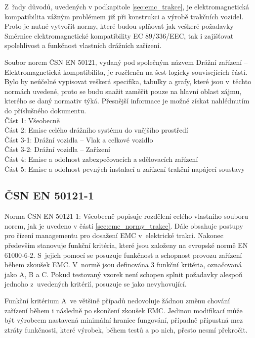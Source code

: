  Z~řady důvodů, uvedených v podkapitole \ref{sec:emc_trakce},  je elektromagnetická kompatibilita vážným problémem již při konstrukci a výrobě trakčních vozidel. Proto je nutné vytvořit normy, které budou splňovat jak veškeré požadavky Směrnice elektromagnetické kompatibility EC 89/336/EEC, tak i zajišťovat spolehlivost a funkčnost vlastních drážních zařízení.

Soubor norem ČSN EN 50121, vydaný pod společným názvem Drážní zařízení – Elektromagnetická kompatibilita, je rozčleněn na šest logicky souvisejících částí. Bylo by neúčelné vypisovat veškerá specifika, tabulky a grafy, které jsou v~těchto normách uvedené, proto se budu snažit zaměřit pouze na hlavní oblast zájmu, kterého se daný normativ týká. Přesnější informace je možné získat nahlédnutím do příslušného dokumentu. \bigskip \\
Část 1: Všeobecně\\
Část 2: Emise celého drážního  systému do vnějšího prostředí\\
Část 3-1: Drážní vozidla – Vlak a celkové vozidlo\\
Část 3-2: Drážní vozidla – Zařízení\\
Část 4: Emise a odolnost zabezpečovacích a sdělovacích zařízení\\
Část 5: Emise a odolnost pevných instalací a zařízení trakční napájecí soustavy\\

\subsection{ČSN EN 50121-1}
Norma ČSN EN 50121-1: Všeobecně popisuje rozdělení celého vlastního souboru norem, jak je uvedeno v části \ref{sec:emc_normy_trakce}. Dále obsahuje postupy pro řízení managementu pro dosažení EMC v~elektrické trakci. Nakonec především stanovuje funkční kritéria, které jsou založeny na evropské normě EN 61000-6-2. S~jejich pomocí se posuzuje funkčnost a schopnost provozu zařízení během zkoušek EMC. V~normě jsou definována 3 funkční kritéria, označovaná jako A, B a C. Pokud testovaný vzorek není schopen splnit požadavky alespoň jednoho z~uvedených kritérií, posuzuje se jako nevyhovující.

Funkční kritérium A~ve většině případů nedovoluje žádnou změnu chování zařízení během i následně po skončení zkoušek EMC. Jedinou modifikací může být výrobcem nastavená minimální hranice fungování, případně přípustná mez ztráty funkčnosti, které výrobek, během testů a po nich, přesto nesmí překročit.

